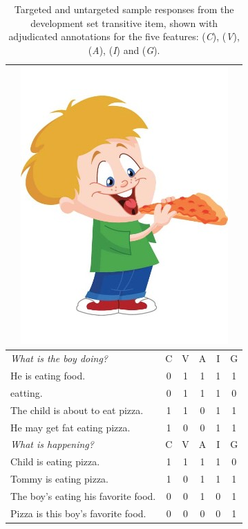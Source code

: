 \begin{table}[htb!]
\begin{center}
\begin{tabular}{|l|c|c|c|c|c|}
\hline
\multicolumn{6}{|c|}{\includegraphics[width=0.45\columnwidth]{figures/I02.jpg}} \\
\hline
\textit{What is the boy doing?} & C & V & A & I & G \\
\hline
\hline
He is eating food. & 0 & 1 & 1 & 1 & 1 \\
\hline
eatting. & 0 & 1 & 1 & 1 & 0 \\
\hline
The child is about to eat pizza. & 1 & 1 & 0 & 1 & 1 \\
\hline
He may get fat eating pizza. & 1 & 0 & 0 & 1 & 1 \\
\hline
\hline
\hline
\textit{What is happening?} & C & V & A & I & G \\
\hline
\hline
Child is eating pizza. & 1 & 1 & 1 & 1 & 0 \\
\hline
Tommy is eating pizza. & 1 & 0 & 1 & 1 & 1 \\
\hline
The boy's eating his favorite food. & 0 & 0 & 1 & 0 & 1 \\
\hline
Pizza is this boy's favorite food. & 0 & 0 & 0 & 0 & 1 \\
\hline
\end{tabular}
\caption{\label{tab:dev-transitive} Targeted and untargeted sample responses from the development set transitive item, shown with adjudicated annotations for the five features:  (\textit{C}),  (\textit{V}),  (\textit{A}),  (\textit{I}) and  (\textit{G}).}
\end{center}
\end{table}

